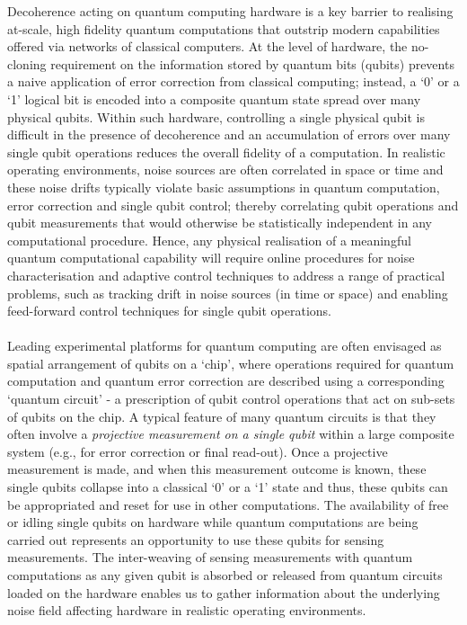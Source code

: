 
Decoherence acting on quantum computing hardware is a key barrier to realising at-scale, high fidelity quantum computations that outstrip modern capabilities offered via networks of classical computers. At the level of hardware, the no-cloning requirement on the information stored by quantum bits (qubits) prevents a naive application of error correction from classical computing; instead, a  `0' or a `1' logical bit is encoded into a composite quantum state spread over many physical qubits. Within such hardware,  controlling a single physical qubit is difficult in the presence of decoherence and an accumulation of errors over many single qubit operations reduces the overall fidelity of a computation. In realistic operating environments, noise sources are often correlated in space or time and these noise drifts typically violate basic assumptions in quantum computation, error correction and single qubit control;  thereby correlating qubit operations and qubit measurements that would otherwise be statistically independent in any computational procedure.  Hence, any physical realisation of a meaningful quantum computational capability will require online procedures for noise characterisation and adaptive control techniques to address a range of practical problems, such as tracking drift in noise sources (in time or space) and enabling feed-forward control techniques for single qubit operations. \\
\\
Leading experimental platforms for quantum computing are often envisaged as spatial arrangement of qubits on a `chip', where operations required for quantum computation and quantum error correction are described using  a corresponding `quantum circuit' - a prescription of qubit control operations that act on sub-sets of qubits on the chip. A typical feature of many quantum circuits is that they often involve a \textit{projective measurement on a single qubit } within a large composite system (e.g., for error correction or final read-out).
Once a projective measurement is made, and when this measurement outcome is known, these single qubits collapse into a classical `0' or a `1' state and thus, these qubits can be appropriated and reset for use in other computations. The availability of free or idling single qubits on hardware while quantum computations are being carried out represents an opportunity to use these qubits for sensing measurements. The inter-weaving of sensing measurements with quantum computations as any given qubit is absorbed or released from quantum circuits loaded on the hardware enables us to gather information about the underlying noise field affecting hardware in realistic operating environments.\\

